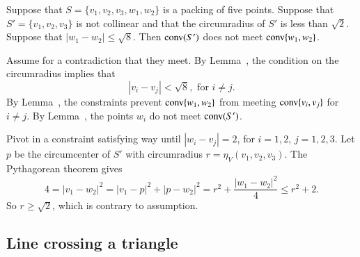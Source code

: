 \begin{tarskidata}
\begin{tarski}

\begin{lemma}
Suppose that  $S=\{v_1,v_2,v_3,w_1,w_2\}$
is a packing of five points.
Suppose that $S'=\{v_1,v_2,v_3\}$ is not collinear and that 
the circumradius of $S'$ is less than
$\sqrt2$.  Suppose that $|w_1-w_2|\le \sqrt8$.  Then
${\operatorname{conv}}(S')$ does not meet ${\operatorname{conv}}\{w_1,w_2\}$.
\end{lemma}

\begin{proved}  Assume for a contradiction that they meet. 
By Lemma~, the condition on the circumradius implies that
	$$|v_i-v_j| < \sqrt8, \text{ for } i\ne j.$$
By Lemma~, the constraints prevent 	${\operatorname{conv}}\{w_1,w_2\}$
from meeting ${\operatorname{conv}}\{v_i,v_j\}$ for $i\ne j$.  By Lemma~,
the points $w_i$ do not meet ${\operatorname{conv}}(S')$.

Pivot in a constraint satisfying way until $|w_i-v_j|=2$, for
$i=1,2$, $j=1,2,3$.  Let $p$ be the circumcenter of $S'$ with circumradius
$r=\eta_V(v_1,v_2,v_3)$. The Pythagorean theorem gives
   $$
   4 = |v_1-w_2|^2 = |v_1-p|^2 + |p-w_2|^2 = r^2 + \frac{|w_1-w_2|^2}4 \le r^2 + 2.
   $$
So $r\ge\sqrt2$, which is contrary to assumption.
\swallowed\end{proved}
\end{tarski}








\begin{tarski}
\section{Line crossing a triangle}


\end{tarski}
\end{tarskidata}
